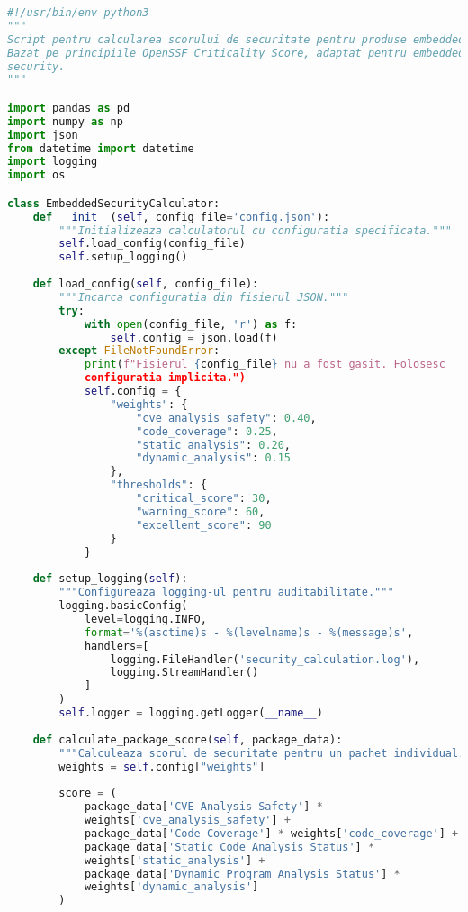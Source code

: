 \documentclass[12pt,a4paper]{article}
\begin{document}
\begin{lstlisting}[language=Python, caption=Script final pentru calcularea scorului de securitate (fără simulări), label=lst:final_security_calculator]
#!/usr/bin/env python3
"""
Script pentru calcularea scorului de securitate pentru produse embedded.
Bazat pe principiile OpenSSF Criticality Score, adaptat pentru embedded 
security.
"""

import pandas as pd
import numpy as np
import json
from datetime import datetime
import logging
import os

class EmbeddedSecurityCalculator:
    def __init__(self, config_file='config.json'):
        """Initializeaza calculatorul cu configuratia specificata."""
        self.load_config(config_file)
        self.setup_logging()
        
    def load_config(self, config_file):
        """Incarca configuratia din fisierul JSON."""
        try:
            with open(config_file, 'r') as f:
                self.config = json.load(f)
        except FileNotFoundError:
            print(f"Fisierul {config_file} nu a fost gasit. Folosesc 
            configuratia implicita.")
            self.config = {
                "weights": {
                    "cve_analysis_safety": 0.40,
                    "code_coverage": 0.25,
                    "static_analysis": 0.20,
                    "dynamic_analysis": 0.15
                },
                "thresholds": {
                    "critical_score": 30,
                    "warning_score": 60,
                    "excellent_score": 90
                }
            }
    
    def setup_logging(self):
        """Configureaza logging-ul pentru auditabilitate."""
        logging.basicConfig(
            level=logging.INFO,
            format='%(asctime)s - %(levelname)s - %(message)s',
            handlers=[
                logging.FileHandler('security_calculation.log'),
                logging.StreamHandler()
            ]
        )
        self.logger = logging.getLogger(__name__)
    
    def calculate_package_score(self, package_data):
        """Calculeaza scorul de securitate pentru un pachet individual."""
        weights = self.config["weights"]
        
        score = (
            package_data['CVE Analysis Safety'] * 
            weights['cve_analysis_safety'] +
            package_data['Code Coverage'] * weights['code_coverage'] +
            package_data['Static Code Analysis Status'] * 
            weights['static_analysis'] +
            package_data['Dynamic Program Analysis Status'] * 
            weights['dynamic_analysis']
        )
        

\end{lstlisting}
\end{document}
